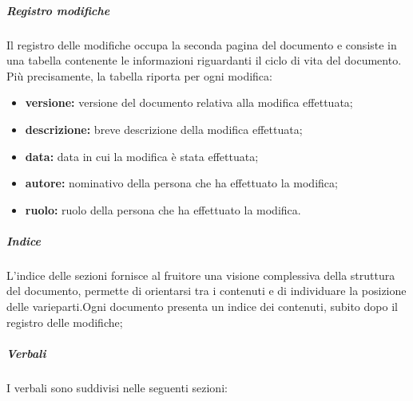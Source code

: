 				\subparagraph{Registro modifiche}
					Il registro delle modifiche occupa la seconda pagina del documento e consiste in una tabella contenente le informazioni riguardanti il ciclo di vita del documento. Più precisamente, la tabella riporta per ogni modifica:
					\begin{itemize}
						\item \textbf{versione:} versione del documento relativa alla modifica effettuata;
						\item \textbf{descrizione:} breve descrizione della modifica effettuata;
						\item \textbf{data:} data in cui la modifica è stata effettuata;
						\item \textbf{autore:} nominativo della persona che ha effettuato la modifica;
						\item \textbf{ruolo:} ruolo della persona che ha effettuato la modifica.
					\end{itemize}
				\subparagraph{Indice}
				L’indice delle sezioni fornisce al fruitore una visione complessiva della struttura del documento, permette di orientarsi tra i contenuti e di individuare la posizione delle varieparti.Ogni documento presenta un indice dei contenuti, subito dopo il registro delle modifiche;
				\subparagraph{Verbali}
				I verbali sono suddivisi nelle seguenti sezioni:
